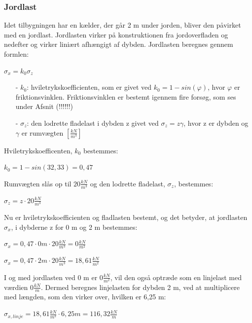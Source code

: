 \subsubsection{Jordlast}
Idet tilbygningen har en kælder, der går 2 m under jorden, bliver den påvirket med en jordlast. Jordlasten virker på konstruktionen fra jordoverfladen og nedefter og virker liniært afhængigt af dybden.
\newline
\newline
Jordlasten beregnes gennem formlen:
\begin{center}
	$\sigma_x = k_0 \sigma_z$
\end{center}

\begin{itemize}
	\item[-] $k_0$: hviletrykskoefficienten, som er givet ved $k_0=1-sin(\varphi)$, hvor $\varphi$ er friktionsvinklen. Friktionsvinklen er bestemt igennem fire forsøg, som ses under Afsnit (!!!!!!)
	\item[-] $\sigma_z$: den lodrette fladelast i dybden z givet ved $\sigma_z = z\gamma$, hvor z er dybden og $\gamma$ er rumvægten $[\frac{kN}{m^3}]$
\end{itemize}

Hviletrykskoefficenten, $k_0$ bestemmes:
\begin{center}
	$k_0 = 1 - sin(32,\!33) = 0,\!47$
\end{center}

Rumvægten slås op til $20 \frac{kN}{m^3}$ \citep[ s. 386]{stabi} og den lodrette fladelast, $\sigma_z$, bestemmes:
\begin{center}
	$\sigma_z = z\cdot 20 \frac{kN}{m^3}$
\end{center}

Nu er hviletrykskoefficienten og fladlasten bestemt, og det betyder, at jordlasten $\sigma_x$, i dybderne z for 0 m og 2 m bestemmes:
\begin{center}
	$\sigma_x = 0,\!47\cdot 0 m\cdot 20 \frac{kN}{m^3} = 0 \frac{kN}{m^2}$
\end{center}

\begin{center}
	$\sigma_x = 0,\!47\cdot 2 m\cdot 20 \frac{kN}{m^3} = 18,\!61 \frac{kN}{m^2}$
\end{center}

I og med jordlasten ved 0 m er $0 \frac{kN}{m^2}$, vil den også optræde som en linjelast med værdien $0 \frac{kN}{m}$. Dermed beregnes linjelasten for dybden 2 m, ved at multiplicere med længden, som den virker over, hvilken er 6,25 m:
\begin{center}
	$\sigma_{x,linje} = 18,\!61 \frac{kN}{m^2}\cdot 6,\!25 m = 116,\!32 \frac{kN}{m}$
\end{center}

